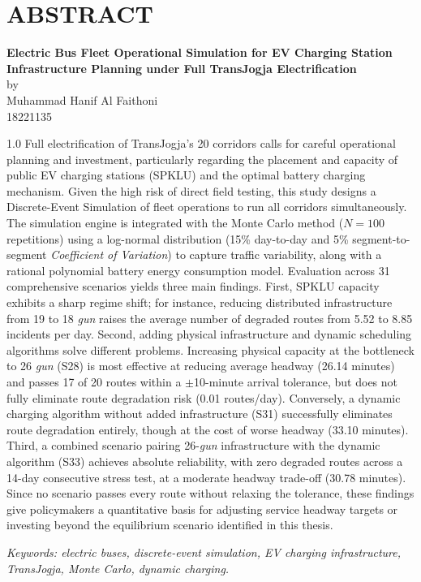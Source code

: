 \chapter*{ABSTRACT}

\begin{center}

    \textbf{Electric Bus Fleet Operational Simulation for EV Charging Station Infrastructure Planning under Full TransJogja Electrification} \\
    \vspace{0.4cm}
    by \\
    \vspace{0.4cm}
    Muhammad Hanif Al Faithoni\\
    18221135\\
\end{center}


\begin{spacing}{1.0}
Full electrification of TransJogja's 20 corridors calls for careful operational planning and investment, particularly regarding the placement and capacity of public EV charging stations (SPKLU) and the optimal battery charging mechanism. Given the high risk of direct field testing, this study designs a Discrete-Event Simulation of fleet operations to run all corridors simultaneously. The simulation engine is integrated with the Monte Carlo method ($N=100$ repetitions) using a log-normal distribution (15\% day-to-day and 5\% segment-to-segment \textit{Coefficient of Variation}) to capture traffic variability, along with a rational polynomial battery energy consumption model. Evaluation across 31 comprehensive scenarios yields three main findings. First, SPKLU capacity exhibits a sharp regime shift; for instance, reducing distributed infrastructure from 19 to 18 \textit{gun} raises the average number of degraded routes from 5.52 to 8.85 incidents per day. Second, adding physical infrastructure and dynamic scheduling algorithms solve different problems. Increasing physical capacity at the bottleneck to 26 \textit{gun} (S28) is most effective at reducing average headway (26.14 minutes) and passes 17 of 20 routes within a $\pm$10-minute arrival tolerance, but does not fully eliminate route degradation risk (0.01 routes/day). Conversely, a dynamic charging algorithm without added infrastructure (S31) successfully eliminates route degradation entirely, though at the cost of worse headway (33.10 minutes). Third, a combined scenario pairing 26-\textit{gun} infrastructure with the dynamic algorithm (S33) achieves absolute reliability, with zero degraded routes across a 14-day consecutive stress test, at a moderate headway trade-off (30.78 minutes). Since no scenario passes every route without relaxing the tolerance, these findings give policymakers a quantitative basis for adjusting service headway targets or investing beyond the equilibrium scenario identified in this thesis.

\vspace{0.5cm}
\noindent\textit{Keywords: electric buses, discrete-event simulation,
EV charging infrastructure, TransJogja, Monte Carlo, dynamic charging.}
\end{spacing}
